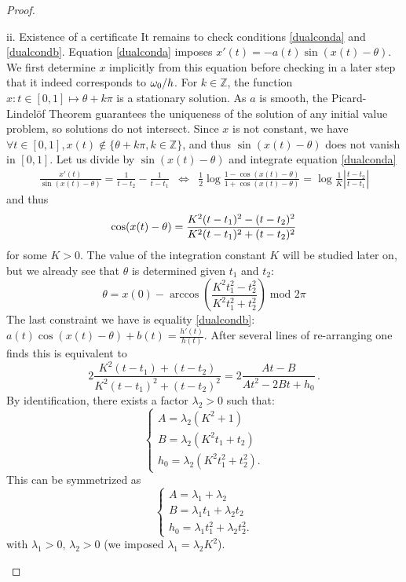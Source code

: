 \begin{proof}
\begin{paragraph}{ii. Existence of a certificate}
It remains to check conditions \eqref{dualconda} and \eqref{dualcondb}. Equation \eqref{dualconda} imposes $x'(t)=-a(t)\sin (x(t)-\theta)$. We first determine $x$ implicitly from this equation before checking in a later step that it indeed corresponds to $\omega_0/h$. For $k\in \mathbb{Z}$, the function $x : t\in [0,1] \mapsto \theta +k\pi$ is a stationary solution. As $a$ is smooth, the Picard-Lindel\"of Theorem guarantees the uniqueness of the solution of any initial value problem, so solutions do not intersect. Since $x$ is not constant, we have $\forall t \in [0,1], x(t)\notin \{ \theta + k\pi, k \in \mathbb{Z} \}$, and thus $\sin(x(t)-\theta)$ does not vanish in $[0,1]$. Let us divide by $\sin(x(t)-\theta)$ and integrate equation \eqref{dualconda}
\begin{eqnarray*}
\frac{x'(t)}{\sin(x(t)-\theta)} = \frac{1}{t-t_2} -\frac{1}{t-t_1}
&\Leftrightarrow&
 \frac12 \log \frac{1-\cos (x(t)-\theta)}{1+\cos (x(t)-\theta)} = \log \frac{1}{K}  \left\vert \frac{t-t_2}{t-t_1} \right\vert
\end{eqnarray*}
and thus
\begin{equation}
\label{eq: implicit x prime}
\cos (x(t)-\theta) = \frac{K^2(t-t_1)^2 -(t-t_2)^2}{K^2(t-t_1)^2 +(t-t_2)^2}\\
\end{equation}
for some $K > 0$. The value of the integration constant $K$ will be studied later on, but we already see that $\theta$ is determined given $t_1$ and $t_2$:
\[
\theta= x(0) - \arccos \left( \frac{K^2t_1^2-t_2^2}{K^2t_1^2+t_2^2}\right)\; \text{mod } 2\pi
\]
The last constraint we have is equality \eqref{dualcondb}: $a(t)\cos (x(t)-\theta) +b(t)= \frac{h'(t)}{h(t)}$.
After several lines of re-arranging one finds this is equivalent to
$$
2\frac{K^2(t-t_1)+(t-t_2)}{K^2(t-t_1)^2+(t-t_2)^2}=2\frac{At-B}{At^2-2Bt+h_0} \, .
$$
By identification, there exists a factor $\lambda_2 >0$ such that:
\begin{equation*}
\begin{cases}
A= \lambda_2(K^2+1)\\
B= \lambda_2(K^2 t_1+t_2)\\
h_0=\lambda_2(K^2 t_1^2+t_2^2).
\end{cases}
\end{equation*}
This can be symmetrized as
\begin{equation}
\begin{cases}
A= \lambda_1+\lambda_2\\
B= \lambda_1 t_1+\lambda_2 t_2\\
h_0=\lambda_1 t_1^2+\lambda_2 t_2^2.
\end{cases}
\label{diraccondition}
\end{equation}
with $\lambda_1>0 , \, \lambda_2 > 0$ (we imposed $\lambda_1=\lambda_2 K^2$).


\end{paragraph}
\end{proof}
